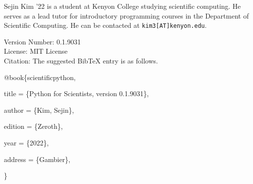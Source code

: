 \documentclass{book}
\newcommand{\booklicense}{MIT License}
\newcommand{\bookversion}{0.1.9031}
\begin{document}


















\backmatter

\printindex

\noindent Sejin Kim '22 is a student at Kenyon College studying scientific computing. He serves as a lead tutor for introductory programming courses in the Department of Scientific Computing. He can be contacted at \verb|kim3[AT]kenyon.edu|.

\begin{titlepage}
\begin{flushleft}
Version Number: \bookversion\\
License: \booklicense\\
Citation: The suggested BibTeX entry is as follows.

\vspace{5mm}

{\selectfont
@book\{scientificpython,

    title = \{Python for Scientists, version \bookversion\},

    author = \{Kim, Sejin\},

    edition = \{Zeroth\},

    year = \{2022\},

    address = \{Gambier\},

\}
}
\end{flushleft}
\end{titlepage}
\restoregeometry
\end{document}
